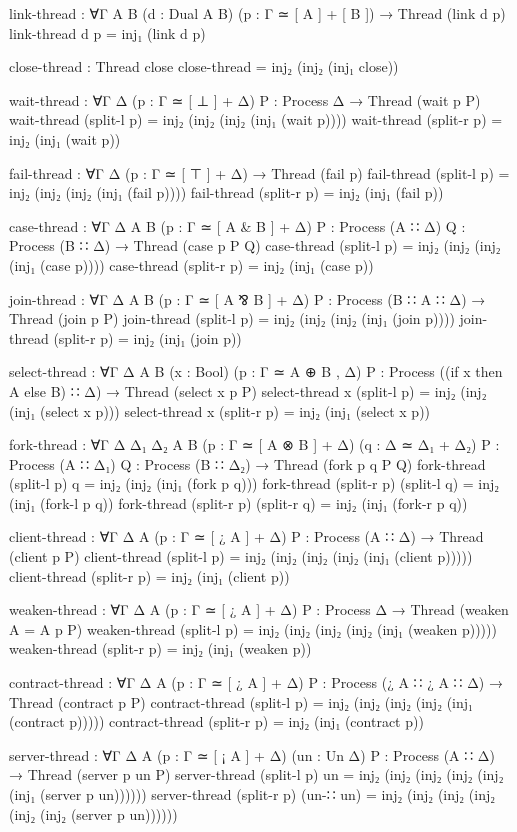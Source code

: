 \begin{code}[hide]
link-thread : ∀{Γ A B} (d : Dual A B) (p : Γ ≃ [ A ] + [ B ]) → Thread (link d p)
link-thread d p = inj₁ (link d p)

close-thread : Thread close
close-thread = inj₂ (inj₂ (inj₁ close))

wait-thread : ∀{Γ Δ} (p : Γ ≃ [ ⊥ ] + Δ) {P : Process Δ} → Thread (wait p P)
wait-thread (split-l p) = inj₂ (inj₂ (inj₂ (inj₁ (wait p))))
wait-thread (split-r p) = inj₂ (inj₁ (wait p))

fail-thread : ∀{Γ Δ} (p : Γ ≃ [ ⊤ ] + Δ) → Thread (fail p)
fail-thread (split-l p) = inj₂ (inj₂ (inj₂ (inj₁ (fail p))))
fail-thread (split-r p) = inj₂ (inj₁ (fail p))

case-thread :
  ∀{Γ Δ A B} (p : Γ ≃ [ A & B ] + Δ) {P : Process (A ∷ Δ)} {Q : Process (B ∷ Δ)} →
  Thread (case p P Q)
case-thread (split-l p) = inj₂ (inj₂ (inj₂ (inj₁ (case p))))
case-thread (split-r p) = inj₂ (inj₁ (case p))

join-thread :
  ∀{Γ Δ A B} (p : Γ ≃ [ A ⅋ B ] + Δ) {P : Process (B ∷ A ∷ Δ)} →
  Thread (join p P)
join-thread (split-l p) = inj₂ (inj₂ (inj₂ (inj₁ (join p))))
join-thread (split-r p) = inj₂ (inj₁ (join p))

select-thread :
  ∀{Γ Δ A B} (x : Bool) (p : Γ ≃ A ⊕ B , Δ) {P : Process ((if x then A else B) ∷ Δ)} →
  Thread (select x p P)
select-thread x (split-l p) = inj₂ (inj₂ (inj₁ (select x p)))
select-thread x (split-r p) = inj₂ (inj₁ (select x p))

fork-thread :
  ∀{Γ Δ Δ₁ Δ₂ A B} (p : Γ ≃ [ A ⊗ B ] + Δ) (q : Δ ≃ Δ₁ + Δ₂)
  {P : Process (A ∷ Δ₁)} {Q : Process (B ∷ Δ₂)} →
  Thread (fork p q P Q)
fork-thread (split-l p) q = inj₂ (inj₂ (inj₁ (fork p q)))
fork-thread (split-r p) (split-l q) = inj₂ (inj₁ (fork-l p q))
fork-thread (split-r p) (split-r q) = inj₂ (inj₁ (fork-r p q))

client-thread :
  ∀{Γ Δ A} (p : Γ ≃ [ ¿ A ] + Δ)
  {P : Process (A ∷ Δ)} →
  Thread (client p P)
client-thread (split-l p) = inj₂ (inj₂ (inj₂ (inj₂ (inj₁ (client p)))))
client-thread (split-r p) = inj₂ (inj₁ (client p))

weaken-thread :
  ∀{Γ Δ A} (p : Γ ≃ [ ¿ A ] + Δ)
  {P : Process Δ} →
  Thread (weaken {A = A} p P)
weaken-thread (split-l p) = inj₂ (inj₂ (inj₂ (inj₂ (inj₁ (weaken p)))))
weaken-thread (split-r p) = inj₂ (inj₁ (weaken p))

contract-thread :
  ∀{Γ Δ A} (p : Γ ≃ [ ¿ A ] + Δ)
  {P : Process (¿ A ∷ ¿ A ∷ Δ)} →
  Thread (contract p P)
contract-thread (split-l p) = inj₂ (inj₂ (inj₂ (inj₂ (inj₁ (contract p)))))
contract-thread (split-r p) = inj₂ (inj₁ (contract p))

server-thread :
  ∀{Γ Δ A} (p : Γ ≃ [ ¡ A ] + Δ) (un : Un Δ) {P : Process (A ∷ Δ)} →
  Thread (server p un P)
server-thread (split-l p) un = inj₂ (inj₂ (inj₂ (inj₂ (inj₂ (inj₁ (server p un))))))
server-thread (split-r p) (un-∷ un) = inj₂ (inj₂ (inj₂ (inj₂ (inj₂ (inj₂ (server p un))))))
\end{code}

